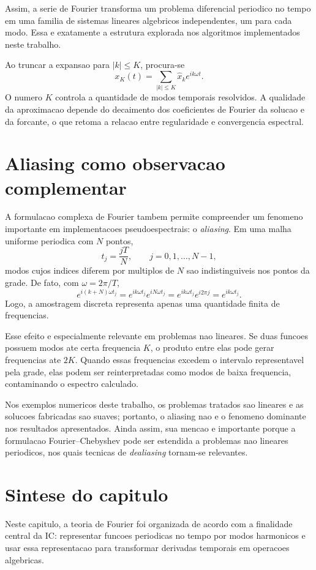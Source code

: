 Assim, a serie de Fourier transforma um problema diferencial periodico no tempo
em uma familia de sistemas lineares algebricos independentes, um para cada
modo. Essa e exatamente a estrutura explorada nos algoritmos implementados
neste trabalho.

Ao truncar a expansao para \(|k|\le K\), procura-se
\[
x_K(t)=\sum_{|k|\le K}\widehat x_k e^{ik\omega t}.
\]
O numero \(K\) controla a quantidade de modos temporais resolvidos. A qualidade
da aproximacao depende do decaimento dos coeficientes de Fourier da solucao e
da forcante, o que retoma a relacao entre regularidade e convergencia
espectral.

\section{Aliasing como observacao complementar}
\label{subsec:aliasing-fourier}

A formulacao complexa de Fourier tambem permite compreender um fenomeno
importante em implementacoes pseudoespectrais: o \emph{aliasing}. Em uma malha
uniforme periodica com \(N\) pontos,
\[
t_j=\frac{jT}{N},
\qquad j=0,1,\dots,N-1,
\]
modos cujos indices diferem por multiplos de \(N\) sao indistinguiveis nos
pontos da grade. De fato, com \(\omega=2\pi/T\),
\[
e^{i(k+N)\omega t_j}
=
e^{ik\omega t_j}e^{iN\omega t_j}
=
e^{ik\omega t_j}e^{i2\pi j}
=
e^{ik\omega t_j}.
\]
Logo, a amostragem discreta representa apenas uma quantidade finita de
frequencias.

Esse efeito e especialmente relevante em problemas nao lineares. Se duas
funcoes possuem modos ate certa frequencia \(K\), o produto entre elas pode
gerar frequencias ate \(2K\). Quando essas frequencias excedem o intervalo
representavel pela grade, elas podem ser reinterpretadas como modos de baixa
frequencia, contaminando o espectro calculado.

Nos exemplos numericos deste trabalho, os problemas tratados sao lineares e as
solucoes fabricadas sao suaves; portanto, o aliasing nao e o fenomeno dominante
nos resultados apresentados. Ainda assim, sua mencao e importante porque a
formulacao Fourier--Chebyshev pode ser estendida a problemas nao lineares
periodicos, nos quais tecnicas de \emph{dealiasing} tornam-se relevantes.

\section{Sintese do capitulo}

Neste capitulo, a teoria de Fourier foi organizada de acordo com a finalidade
central da IC: representar funcoes periodicas no tempo por modos harmonicos e
usar essa representacao para transformar derivadas temporais em operacoes
algebricas.

